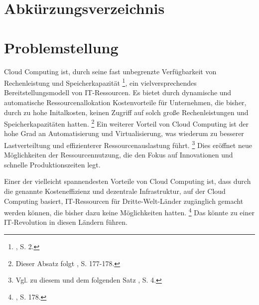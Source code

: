 \documentclass[
	a4paper,
	oneside,
	12pt,
	liststotocnumbered
]{article}
\let\cite\textcite
\begin{document}



\tableofcontents
\newpage

\section*{Abkürzungsverzeichnis}
\begin{acronym}[TTTTTTTTTTTTTTTTTTTT]
\end{acronym}
\newpage

\normalsize
{}

\section{Problemstellung}
Cloud Computing ist, durch seine fast unbegrenzte Verfügbarkeit von Rechenleistung und Speicherkapazität
\footnote{\cite{Nallur.2012}, S. 2.}, 
ein vielversprechendes Bereitstellungsmodell von IT-Ressourcen. Es bietet durch dynamische und automatische Ressourcenallokation Kostenvorteile für Unternehmen, die bisher, durch zu hohe Initalkosten, keinen Zugriff auf solch große Rechenleistungen und Speicherkapazitäten hatten. 
\footnote{Dieser Absatz folgt \cite{Marston.2011}, S. 177-178.}
Ein weiterer Vorteil von Cloud Computing ist der hohe Grad an Automatisierung und Virtualisierung, was wiederum zu besserer Lastverteiltung und effizienterer Ressourcenauslastung führt.
\footnote{Vgl. zu diesem und dem folgenden Satz \cite{Boss.2007}, S. 4.}
Dies eröffnet neue Möglichkeiten der Ressourcennutzung, die den Fokus auf Innovationen und schnelle Produktionszeiten legt.

Einer der vielleicht spannendesten Vorteile von Cloud Computing ist, dass durch die genannte Kosteneffizienz und dezentrale Infrastruktur, auf der Cloud Computing basiert, IT-Ressourcen für Dritte-Welt-Länder zugänglich gemacht werden können, die bisher dazu keine Möglichkeiten hatten. 
\footnote{\cite{Marston.2011}, S. 178.}
Das könnte zu einer IT-Revolution in diesen Ländern führen.
\end{document}
